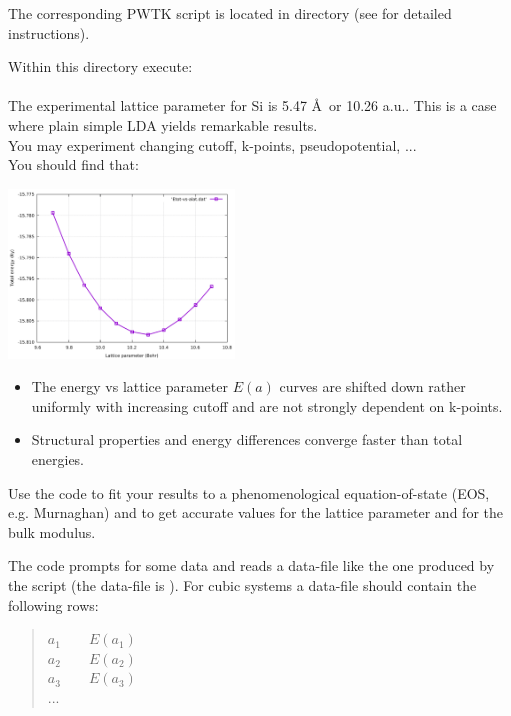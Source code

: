 \documentclass[landscape]{foils}
\begin{document}

The corresponding PWTK script is located in
 directory (see  for
detailed instructions).

\parbox{0.5\textwidth}{
  Within this directory execute:\\[0.5em]
  \indent\prompt{}\\[0.5em]

  The experimental lattice parameter for Si is 5.47 \AA\ or 10.26
  a.u..  This is a case where plain simple LDA yields remarkable results.\\
  You may experiment changing cutoff, k-points, pseudopotential,
  ...\\[0.5em]
  You should find that:
} \parbox{0.5\textwidth}{
  \begin{flushright}
    \includegraphics[width=0.45\textwidth]{figs/etot-vs-alat.pdf}
  \end{flushright}
}
\begin{itemize}
\item The energy vs lattice parameter $E(a)$ curves are shifted down rather 
  uniformly with increasing cutoff and are not strongly dependent on k-points.
\item Structural properties and energy differences converge faster than total
  energies.
\end{itemize}

%
Use the code  to fit your results to a
phenomenological equation-of-state (EOS, e.g. Murnaghan) and to get
accurate values for the lattice parameter and for the bulk modulus.

The  code prompts for some data and reads a data-file like
the one produced by the  script (the data-file is
). For cubic systems a data-file should contain
the following rows:
\begin{quote}
$a_1\qquad E(a_1)$\\
$a_2\qquad E(a_2)$\\
$a_3\qquad E(a_3)$\\
...\\  
\end{quote}
\end{document}
